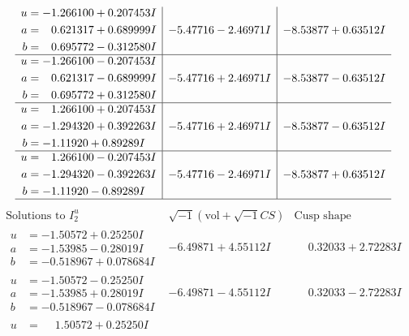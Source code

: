 \documentclass[1p]{elsarticle_modified}
\theoremstyle{definition}
\newcommand{\I}{\sqrt{-1}}
\begin{document}
$$\begin{array}{c|c|c}
\begin{aligned}
u &= -1.266100 + 0.207453 I \\
a &= \phantom{-}0.621317 + 0.689999 I \\
b &= \phantom{-}0.695772 - 0.312580 I\end{aligned}
 & -5.47716 - 2.46971 I & -8.53877 + 0.63512 I \\ \hline\begin{aligned}
u &= -1.266100 - 0.207453 I \\
a &= \phantom{-}0.621317 - 0.689999 I \\
b &= \phantom{-}0.695772 + 0.312580 I\end{aligned}
 & -5.47716 + 2.46971 I & -8.53877 - 0.63512 I \\ \hline\begin{aligned}
u &= \phantom{-}1.266100 + 0.207453 I \\
a &= -1.294320 + 0.392263 I \\
b &= -1.11920 + 0.89289 I\end{aligned}
 & -5.47716 + 2.46971 I & -8.53877 - 0.63512 I \\ \hline\begin{aligned}
u &= \phantom{-}1.266100 - 0.207453 I \\
a &= -1.294320 - 0.392263 I \\
b &= -1.11920 - 0.89289 I\end{aligned}
 & -5.47716 - 2.46971 I & -8.53877 + 0.63512 I\\
 \hline 
 \end{array}$$\newpage$$\begin{array}{c|c|c}  
\text{Solutions to }I^u_{2}& \I (\text{vol} + \sqrt{-1}CS) & \text{Cusp shape}\\
 \hline 
\begin{aligned}
u &= -1.50572 + 0.25250 I \\
a &= -1.53985 - 0.28019 I \\
b &= -0.518967 + 0.078684 I\end{aligned}
 & -6.49871 + 4.55112 I & \phantom{-}0.32033 + 2.72283 I \\ \hline\begin{aligned}
u &= -1.50572 - 0.25250 I \\
a &= -1.53985 + 0.28019 I \\
b &= -0.518967 - 0.078684 I\end{aligned}
 & -6.49871 - 4.55112 I & \phantom{-}0.32033 - 2.72283 I \\ \hline\begin{aligned}
u &= \phantom{-}1.50572 + 0.25250 I \\

\end{aligned}
\end{array}$$
\end{document}

